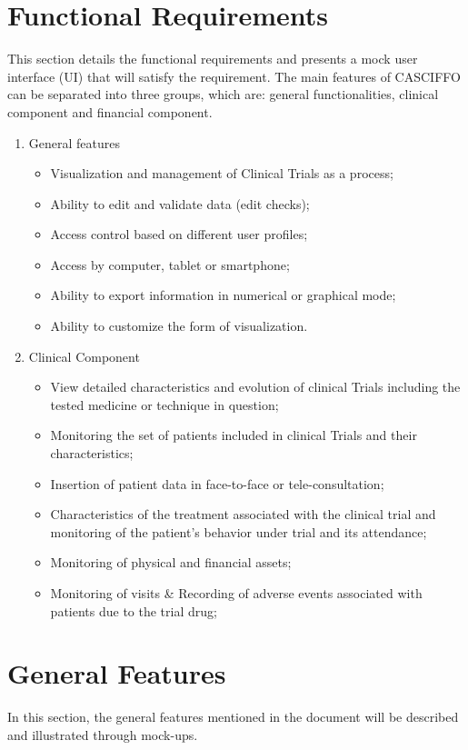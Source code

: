 \section{Functional Requirements}
This section details the functional requirements and presents a mock user interface (UI) that will satisfy the requirement.
The main features of CASCIFFO can be separated into three groups, which are: general functionalities, clinical component and financial component.  
\begin{enumerate}
    \item General features
        \begin{itemize}
            \item Visualization and management of Clinical Trials as a process; 
            \item Ability to edit and validate data (edit checks);
            \item Access control based on different user profiles; 
            \item Access by computer, tablet or smartphone; 
            \item Ability to export information in numerical or graphical mode; 
            \item Ability to customize the form of visualization.
        \end{itemize}
    \item Clinical Component
        \begin{itemize}
           \item View detailed characteristics and evolution of clinical Trials including the tested medicine or technique in question;
           \item Monitoring the set of patients included in clinical Trials and their characteristics;
           \item Insertion of patient data in face-to-face or tele-consultation;
           \item Characteristics of the treatment associated with the clinical trial and monitoring of the patient’s behavior under trial and its attendance;
           \item Monitoring of physical and financial assets;
           \item Monitoring of visits \& Recording of adverse events associated with patients due to the trial drug;
        \end{itemize}
\end{enumerate}

\section{General Features}
In this section, the general features mentioned in the document will be described and illustrated through mock-ups.


